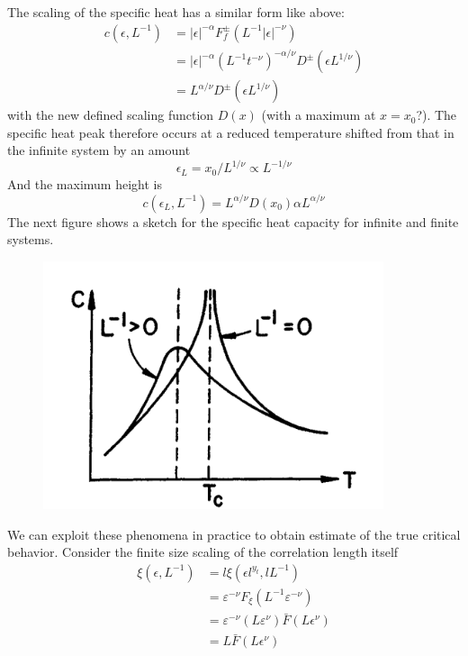 	The scaling of the specific heat has a similar form like above:
	\begin{align}
		c(\epsilon, L^{-1}) &=	|\epsilon|^{-\alpha} F_f^\pm(L^{-1} |\epsilon|^{-\nu}) \\
		&= |\epsilon|^{-\alpha} (L^{-1}t^{-\nu})^{-\alpha/\nu} D^\pm (\epsilon L^{1/\nu}) \\
		&= L^{\alpha/ \nu} D^\pm (\epsilon L^{1/\nu})
	\end{align}
	with the new defined scaling function $D(x)$ (with a maximum at $x = x_0$?). The specific heat peak therefore occurs at a reduced temperature shifted from that in the infinite system by an amount
	\begin{equation}
		\epsilon_L = x_0 /	L^{1/\nu} \propto L^{-1/\nu}
	\end{equation}
	And the maximum height is
	\begin{equation}
		c(\epsilon_L, L^{-1}) = L^{\alpha/\nu} D(x_0) \alpha L^{\alpha/\nu}
	\end{equation}
	The next figure shows a sketch for the specific heat capacity for infinite and finite systems.
	\begin{figure}[htp]
		\centering
		\includegraphics[width=10cm]{graphics/heat-finite-system.png}
	\end{figure}
	We can exploit these phenomena in practice to obtain estimate of the true critical behavior. Consider the finite size scaling of the correlation length itself
	\begin{align}
		\xi(\epsilon, L^{-1}) &=	l \xi(\epsilon l^{y_t}, l L^{-1}) \\
		&=\varepsilon^{-\nu} F_\xi (L^{-1} \varepsilon^{-\nu}) \\
		&= \varepsilon^{-\nu}(L \varepsilon^\nu) \bar{F}(L\epsilon^\nu) \\
		&=L \bar{F}(L\epsilon^\nu)
	\end{align}
